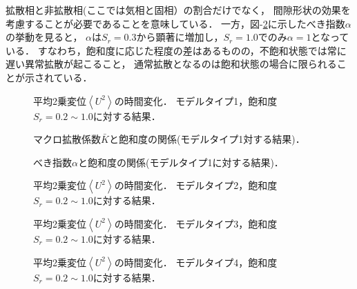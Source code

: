 拡散相と非拡散相(ここでは気相と固相）の割合だけでなく，
間隙形状の効果を考慮することが必要であることを意味している．
一方，図-\ref{fig:fig6}に示したべき指数$\alpha$の挙動を見ると，
$\alpha$は$S_r=0.3$から顕著に増加し，$S_r=1.0$でのみ$\alpha=1$となっている．
すなわち，飽和度に応じた程度の差はあるものの，不飽和状態では常に遅い異常拡散が起こること，
通常拡散となるのは飽和状態の場合に限られることが示されている．
\begin{figure}[t]
\begin{center}
\caption{
	平均2乗変位$\left<U^2\right>$の時間変化．
	モデルタイプ1，飽和度$S_r=0.2\sim 1.0$に対する結果．
}
\label{fig:fig5}
\end{center}
\end{figure}
\begin{figure}
\begin{center}
\caption{
	マクロ拡散係数$\bar K$と飽和度の関係(モデルタイプ1対する結果)．
	}
\label{fig:fig6}
\end{center}
\end{figure}
\begin{figure}
\begin{center}
\caption{
	べき指数$\alpha$と飽和度の関係(モデルタイプ1に対する結果)．
	}
\label{fig:fig7}
\end{center}
\end{figure}
\vspace{-5mm}
%
\begin{figure}[t]
\begin{center}
\caption{
	平均2乗変位$\left<U^2\right>$の時間変化．
	モデルタイプ2，飽和度$S_r=0.2\sim 1.0$に対する結果．
}
\label{fig:fig11}
\end{center}
\end{figure}
\begin{figure}[t]
\begin{center}
\caption{
	平均2乗変位$\left<U^2\right>$の時間変化．
	モデルタイプ3，飽和度$S_r=0.2\sim 1.0$に対する結果．
}
\label{fig:fig12}
\end{center}
\end{figure}
\begin{figure}[t]
\begin{center}
\caption{
	平均2乗変位$\left<U^2\right>$の時間変化．
	モデルタイプ4，飽和度$S_r=0.2\sim 1.0$に対する結果．
}
\label{fig:fig13}
\end{center}
\end{figure}
